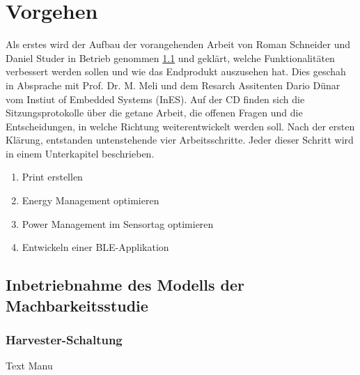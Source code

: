 \chapter{Vorgehen}
 
 Als erstes wird der Aufbau der vorangehenden Arbeit von Roman Schneider und Daniel Studer \cite{PA_bicycle} in Betrieb genommen \ref{v_inbetriebnahme} und geklärt, welche Funktionalitäten verbessert werden sollen und wie das Endprodukt auszusehen hat. Dies geschah in Absprache mit Prof. Dr. M. Meli und dem Resarch Assitenten Dario Dünar vom Instiut of Embedded Systems (InES). Auf der CD finden sich die Sitzungsprotokolle über die getane Arbeit, die offenen Fragen und die Entscheidungen, in welche Richtung weiterentwickelt werden soll. Nach der ersten Klärung, entstanden untenstehende vier Arbeitsschritte. Jeder dieser Schritt wird in einem Unterkapitel beschrieben.\\

\begin{enumerate}
  \item Print erstellen
  \item Energy Management optimieren
  \item Power Management im Sensortag optimieren
  \item Entwickeln einer BLE-Applikation
 \end{enumerate}  


 
\section{Inbetriebnahme des Modells der Machbarkeitsstudie}\label{v_inbetriebnahme} 


\subsection{Harvester-Schaltung}

Text Manu

